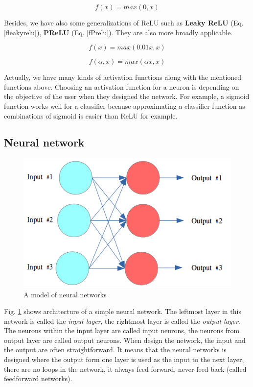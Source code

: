 \begin{equation}
	f(x) = max(0,x)
	\label{frelu}
\end{equation}

Besides, we have also some generalizations of ReLU such as \textbf{Leaky ReLU} (Eq. \ref{fleakyrelu}), \textbf{PReLU} (Eq. \ref{fPrelu}). They are also more broadly applicable.

\begin{equation}
	f(x) = max(0.01x, x)
	\label{fleakyrelu}
\end{equation}

\begin{equation}
	f(\alpha,x) = max(\alpha x, x)
	\label{fPrelu}
\end{equation}

Actually, we have many kinds of activation functions along with the mentioned functions above. Choosing an activation function for a neuron is depending on the objective of the user when they designed the network. For example, a sigmoid function works well for a classifier because approximating a classifier function as combinations of sigmoid is easier than ReLU for example.

\subsection{Neural network}

\begin{figure}[h]
	\centering
	\includegraphics[scale=0.5]{images/neural_net}
	\caption{A model of neural networks}
	\label{fignnnetworks}
\end{figure}

Fig. \ref{fignnnetworks} shows architecture of a simple neural network. The leftmost layer in this network is called the \textit{input layer}, the rightmost layer is called the \textit{output layer}. The neurons within the input layer are called input neurons, the neurons from output layer are called output neurons. When design the network, the input and the output are often straightforward. It means that the neural networks is designed where the output form one layer is used as the input to the next layer, there are no loops in the network, it always feed forward, never feed back (called feedforward networks).

